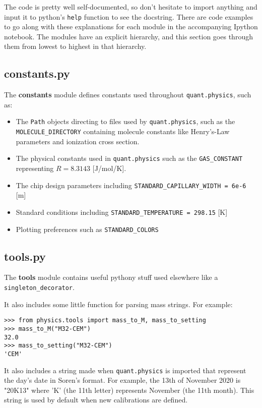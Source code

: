 \documentclass{article}
\newcommand{\code}[1]{\colorbox{codegray}{\lstinline{#1}}}
\begin{document}
The code is pretty well self-documented, so don't hesitate to import anything and input it to python's \code{help} function to see the docstring. There are code examples to go along with these explanations for each module in the accompanying Ipython notebook. The modules have an explicit hierarchy, and this section goes through them from lowest to highest in that hierarchy.


\subsection{constants.py}\label{sec:constants}

The \textbf{constants} module defines constants used throughout \code{quant.physics}, such as:
\begin{itemize}
	\item The \code{Path} objects directing to files used by \code{quant.physics}, such as the \code{MOLECULE_DIRECTORY} containing molecule constants like Henry's-Law parameters and ionization cross section.	
	\item The physical constants used in \code{quant.physics} such as the \code{GAS_CONSTANT} representing $R=8.3143$ [J/mol/K].
	\item The chip design parameters including \code{STANDARD_CAPILLARY_WIDTH = 6e-6} [m]
	\item Standard conditions including \code{STANDARD_TEMPERATURE = 298.15} [K]
	\item Plotting preferences such as \code{STANDARD_COLORS}
\end{itemize}

\subsection{tools.py}\label{sec:tools}

The \textbf{tools} module contains useful pythony stuff used elsewhere like a \code{singleton_decorator}.

It also includes some little function for parsing mass strings. For example:

\begin{lstlisting}
>>> from physics.tools import mass_to_M, mass_to_setting
>>> mass_to_M("M32-CEM")
32.0
>>> mass_to_setting("M32-CEM")
'CEM'
\end{lstlisting}

It also includes a string made when \code{quant.physics} is imported that represent the day's date in Soren's format. For example, the 13th of November 2020 is "20K13" where 'K' (the 11th letter) represents November (the 11th month). This string is used by default when new calibrations are defined.
\end{document}
